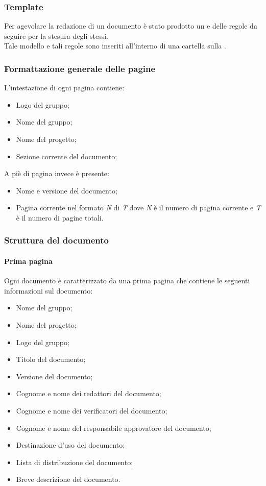   \subsubsection{Template}
    Per agevolare la redazione di un documento è stato prodotto un  e delle regole da seguire per la stesura degli stessi.\\
    Tale modello e tali regole sono inseriti all'interno di una cartella  sulla .

\subsubsection{Formattazione generale delle pagine}
        L’intestazione di ogni pagina contiene:
        \begin{itemize}
          \item Logo del gruppo;
          \item Nome del gruppo;
          \item Nome del progetto;
          \item Sezione corrente del documento;
        \end{itemize}
        A piè di pagina invece è presente:
        \begin{itemize}
          \item Nome e versione del documento;
          \item Pagina corrente nel formato \emph{N} di \emph{T} dove \emph{N} è il numero di pagina corrente e \emph{T} è il numero di pagine totali.
        \end{itemize}

\subsubsection{Struttura del documento}
      \paragraph{Prima pagina}
        Ogni documento è caratterizzato da una prima pagina che contiene le seguenti informazioni sul documento:\\
        \begin{itemize}
          \item Nome del gruppo;
          \item Nome del progetto;
          \item Logo del gruppo;
          \item Titolo del documento;
          \item Versione del documento;
          \item Cognome e nome dei redattori del documento;
          \item Cognome e nome dei verificatori del documento;
          \item Cognome e nome del responsabile approvatore del documento;
          \item Destinazione d'uso del documento;
          \item Lista di distribuzione del documento;
          \item Breve descrizione del documento.
        \end{itemize}
